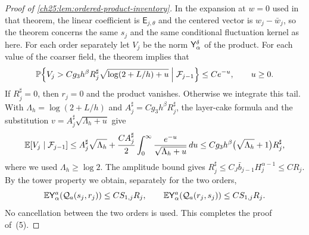 \begin{proof}[Proof of \cref{ch25:lem:ordered-product-inventory}]
In the expansion at $w=0$ used in that theorem, the linear coefficient is $\mathsf E_{j,\theta}$ and the centered vector is $w_j-\bar w_j$, so the theorem concerns the same $s_j$ and the same conditional fluctuation kernel as here. For each order separately let $V_j$ be the norm $\mathsf Y_{\alpha}^{\delta}$ of the product. For each value of the coarser field, the theorem implies that
\[
 \mathbb P\Bigl\{V_j>Cg_3h^\beta R_j^\sharp\sqrt{\log(2+L/h)+u}\Bigm|\mathcal F_{j-1}\Bigr\}\le Ce^{-u},\qquad u\ge0.
\]
If $R_j^\sharp=0$, then $r_j=0$ and the product vanishes. Otherwise we integrate this tail. With $\Lambda_h=\log(2+L/h)$ and $A_j^\sharp=Cg_3h^\beta R_j^\sharp$, the layer-cake formula and the substitution $v=A_j^\sharp\sqrt{\Lambda_h+u}$ give
\[
 \mathbb E[V_j\mid\mathcal F_{j-1}]\le A_j^\sharp\sqrt{\Lambda_h}+\frac{CA_j^\sharp}{2}\int_0^\infty\frac{e^{-u}}{\sqrt{\Lambda_h+u}}\,du\le Cg_3h^\beta\bigl(\sqrt{\Lambda_h}+1\bigr)R_j^\sharp,
\]
where we used $\Lambda_h\ge\log2$. The amplitude bound gives $R_j^\sharp\le C_J\bar b_{j-1}H_j^{\alpha-1}\le CR_j$. By the tower property we obtain, separately for the two orders,
\begin{equation}\label{ch25:eq:marked-cells}
 \mathbb E\mathsf Y_{\alpha}^{a}(\mathcal Q_{a}(s_j,r_j))\le CS_{1,j}R_j,\qquad
 \mathbb E\mathsf Y_{\alpha}^{a}(\mathcal Q_{a}(r_j,s_j))\le CS_{1,j}R_j.
\end{equation}
No cancellation between the two orders is used. This completes the proof of~(5).


\end{proof}
